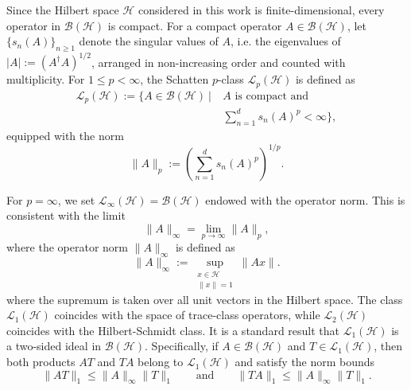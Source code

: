 \documentclass[a4paper, amsfonts, amssymb, amsmath, reprint, showkeys, nofootinbib, twoside, aps, pra]{revtex4-2}
\theoremstyle{definition}
\begin{document}
Since the Hilbert space $\mathcal{H}$ considered in this work is finite-dimensional, every operator in $\mathcal B(\mathcal H)$ is compact.
For a compact operator $A \in \mathcal B(\mathcal H)$, let $\{ s_n(A) \}_{n \ge 1}$ denote the
singular values of $A$, i.e. the eigenvalues of $|A| := (A^{\dagger}A)^{1/2}$,
arranged in non-increasing order and counted with multiplicity.
For $1 \le p < \infty$, the Schatten $p$-class $\mathcal{L}_p(\mathcal H)$ is defined as
\begin{equation}
\begin{split}
    \mathcal{L}_p(\mathcal H) := \Big\{ A \in \mathcal B(\mathcal H) \ \Big|\ & A \text{ is compact and} \\
    &\sum_{n=1}^{d} s_n(A)^p < \infty \Big\},
\end{split}
\end{equation}
equipped with the norm
\begin{equation}
    \|A\|_p := \left( \sum_{n=1}^{d} s_n(A)^p \right)^{1/p}.
\end{equation}

For $p = \infty$, we set $\mathcal{L}_\infty(\mathcal{H}) = \mathcal{B}(\mathcal{H})$ endowed with the operator norm. This is consistent with the limit
\begin{equation}
    \|A\|_\infty = \lim_{p\to \infty} \|A\|_p,
\end{equation}
where the operator norm $\|A\|_\infty$ is defined as
\begin{equation}
    \|A\|_\infty := \sup_{\substack{x \in \mathcal{H} \\ \|x\|=1}} \|Ax\|.
\end{equation}
where the supremum is taken over all unit vectors in the Hilbert space.
The class $\mathcal{L}_1(\mathcal{H})$ coincides with the space of trace-class operators, while
$\mathcal{L}_2(\mathcal{H})$ coincides with the Hilbert-Schmidt class.
It is a standard result that $\mathcal{L}_1(\mathcal{H})$ is a two-sided ideal in $\mathcal{B}(\mathcal{H})$. 
Specifically, if $A \in \mathcal{B}(\mathcal{H})$ and $T \in \mathcal{L}_1(\mathcal{H})$, then both products 
$AT$ and $TA$ belong to $\mathcal{L}_1(\mathcal{H})$ and satisfy the norm bounds
\begin{equation}
    \|AT\|_1 \le \|A\|_\infty \|T\|_1 \qquad \text{and} \qquad \|TA\|_1 \le \|A\|_\infty \|T\|_1.
\end{equation}
\end{document}
